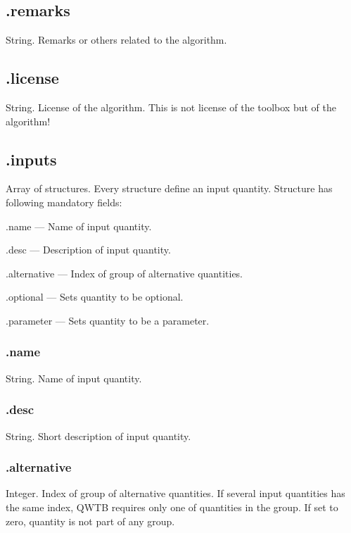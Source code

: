 \documentclass[12pt,a4paper,oneside]{report} %
\begin{document}
\subsection{\textsf{.remarks}} %
\label{structalginforemarks}
String. Remarks or others related to the algorithm.

\subsection{\textsf{.license}} %
\label{structalginfolicense}
String. License of the algorithm. This is not license of the toolbox but of the algorithm!

\subsection{\textsf{.inputs}} %
\label{structalginfoinputs}
Array of structures. Every structure define an input quantity. Structure has following mandatory
fields:
\begin{tightdesc}
        \item [\textsf{.name}] --- Name of input quantity.
        \item [\textsf{.desc}] --- Description of input quantity.
        \item [\textsf{.alternative}] --- Index of group of alternative quantities.
        \item [\textsf{.optional}] --- Sets quantity to be optional.
        \item [\textsf{.parameter}] --- Sets quantity to be a parameter.
\end{tightdesc}

\subsubsection{\textsf{.name}} %
String. Name of input quantity.

\subsubsection{\textsf{.desc}} %
String. Short description of input quantity.

\subsubsection{\textsf{.alternative}} %
Integer. Index of group of alternative quantities. If several input quantities has the same index,
QWTB requires only one of quantities in the group. If set to zero, quantity is not part of any group.
\end{document}
